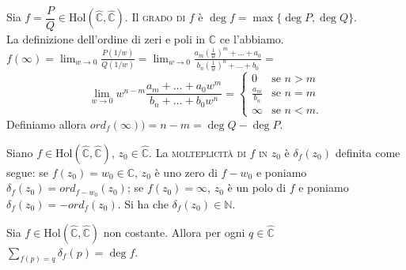 \begin{defn}
  Sia $f=\dfrac{P}{Q} \in \text{Hol}(\hat{\mathbb{C}}, \hat{\mathbb{C}})$. Il \textsc{grado di $f$} è $\deg{f}=\max{\{\deg{P}, \deg{Q}\}}$. \\
  La definizione dell'ordine di zeri e poli in $\mathbb{C}$ ce l'abbiamo. \\
  $\displaystyle f(\infty)=\lim_{w \rightarrow 0} \frac{P(1/w)}{Q(1/w)}=\lim_{w \rightarrow 0} \frac{a_m\left(\frac{1}{w}\right)^m+\dots+a_0}{b_n\left(\frac{1}{w}\right)^n+\dots+b_0}=$ \\
  $$\lim_{w \rightarrow 0} w^{n-m} \frac{a_m+\dots+a_0w^m}{b_n+\dots+b_0w^n}=\begin{cases} 0 & \mbox{se }n>m \\ \frac{a_m}{b_n} & \mbox{se }n=m \\ \infty & \mbox{se } n<m. \end{cases}$$
  Definiamo allora $ord_f(\infty))=n-m=\deg{Q}-\deg{P}$.
\end{defn}

\begin{defn}
  Siano $f \in \text{Hol}(\hat{\mathbb{C}}, \hat{\mathbb{C}})$, $z_0 \in \hat{\mathbb{C}}$.
  La \textsc{molteplicità di $f$ in $z_0$} è $\delta_f(z_0)$ definita come segue: se $f(z_0)=w_0 \in \mathbb{C}$, $z_0$ è uno zero di $f-w_0$ e poniamo $\delta_f(z_0)=ord_{f-w_0}(z_0)$; se $f(z_0)=\infty$, $z_0$ è un polo di $f$ e poniamo $\delta_f(z_0)=-ord_f(z_0)$. Si ha che $\delta_f(z_0) \in \mathbb{N}$.
\end{defn}

\begin{prop}
  Sia $f \in \text{Hol}(\hat{\mathbb{C}}, \hat{\mathbb{C}})$ non costante. Allora per ogni $q \in \hat{\mathbb{C}}$ $\displaystyle \sum_{f(p)=q} \delta_f(p)=\deg{f}$.
\end{prop}

